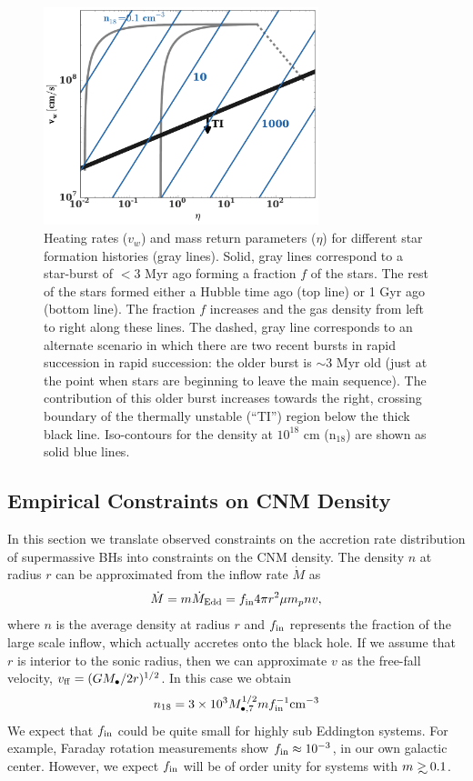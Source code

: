 \documentclass[usenatbib,fleqn]{mnras}
\newcommand\gsim{\mathrel{\rlap{\lower4pt\hbox{\hskip1pt$\sim$}}
    \raise1pt\hbox{$>$}}}
\begin{document}
\begin{figure} 
  \includegraphics[width=8cm]{cnm_plot.pdf}
  \caption{\label{fig:param} Heating rates ($v_w$) and mass return
    parameters ($\eta$) for different star formation histories (gray
    lines). Solid, gray lines correspond to a star-burst of $<3$ Myr
    ago forming a fraction $f$ of the stars. The rest of the stars
    formed either a Hubble time ago (top line) or 1 Gyr ago (bottom
    line). The fraction $f$ increases and the gas density from left to
    right along these lines. The dashed, gray line corresponds to an
    alternate scenario in which there are two recent bursts in rapid
    succession in rapid succession: the older burst is $\sim 3$ Myr
    old (just at the point when stars are beginning to leave the main
    sequence). The contribution of this older burst increases towards
    the right, crossing boundary of the thermally unstable (``TI'')
    region below the thick black line. Iso-contours for the density at
    $10^{18}$ cm ($\mathrm{n_{18}}$) are shown as solid blue lines.} 
\end{figure}


\subsection{Empirical Constraints on CNM Density}

In this section we translate observed constraints on the accretion rate distribution of supermassive BHs into constraints on the CNM density.  The density $n$ at radius $r$ can be approximated from the inflow rate $\dot{M}$ as
\begin{equation}
\dot{M} = m \dot{M}_{\rm Edd}= f_{\rm in} 4 \pi r^2 \mu m_p n v,
\label{eq:mdot}
\end{equation}
where $n$ is the average density at radius $r$ and $f_{\rm in}$
represents the fraction of the large scale inflow, which actually
accretes onto the black hole.  If we assume that $r$ is interior to the sonic radius, then we can approximate $v$ as the free-fall velocity, $v_{\rm ff} = (GM_{\bullet}/2r)^{1/2}$.  In this case we obtain
\begin{equation}
n_{18} = 3 \times 10^3 M_{\bullet,7}^{1/2} m f_{\rm in}^{-1} {\rm
  cm}^{-3}
\label{eq:n18Edd}
\end{equation}
We expect that $f_{\rm in}$ could be quite small for highly sub
Eddington systems. For example, Faraday rotation measurements
\citep{Quataert+2000} show $f_{\rm in}\approx 10^{-3}$, in our own
galactic center. However, we expect $f_{\rm in}$ will be of order
unity for systems with $m\gsim 0.1$.  
\end{document}
